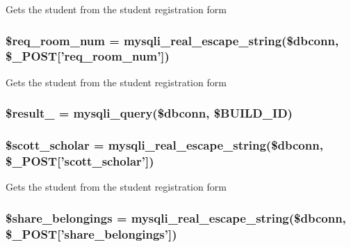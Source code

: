 \-Gets the student from the student registration form \hypertarget{admin__view_2validate_2studentVal_8php_a03ada09603995a51dc132367698e687d}{
\subsubsection[{\$req\-\_\-room\-\_\-num}]{\setlength{\rightskip}{0pt plus 5cm}\$req\-\_\-room\-\_\-num = mysqli\-\_\-real\-\_\-escape\-\_\-string(\$dbconn, \$\-\_\-\-P\-O\-S\-T\mbox{[}'req\-\_\-room\-\_\-num'\mbox{]})}}\label{admin__view_2validate_2studentVal_8php_a03ada09603995a51dc132367698e687d}
\-Gets the student from the student registration form \hypertarget{admin__view_2validate_2studentVal_8php_a0b3f63d6f969a6ad92963ceae90afab9}{
\subsubsection[{\$result\-\_\-9}]{\setlength{\rightskip}{0pt plus 5cm}\$result\-\_ = mysqli\-\_\-query(\$dbconn, \$\-B\-U\-I\-L\-D\-\_\-\-I\-D)}}\label{admin__view_2validate_2studentVal_8php_a0b3f63d6f969a6ad92963ceae90afab9}
\hypertarget{admin__view_2validate_2studentVal_8php_aeba3fa7111a05390371249cf7515b517}{
\subsubsection[{\$scott\-\_\-scholar}]{\setlength{\rightskip}{0pt plus 5cm}\$scott\-\_\-scholar = mysqli\-\_\-real\-\_\-escape\-\_\-string(\$dbconn, \$\-\_\-\-P\-O\-S\-T\mbox{[}'scott\-\_\-scholar'\mbox{]})}}\label{admin__view_2validate_2studentVal_8php_aeba3fa7111a05390371249cf7515b517}
\-Gets the student from the student registration form \hypertarget{admin__view_2validate_2studentVal_8php_ad62de11903542434007800bf0bc24594}{
\subsubsection[{\$share\-\_\-belongings}]{\setlength{\rightskip}{0pt plus 5cm}\$share\-\_\-belongings = mysqli\-\_\-real\-\_\-escape\-\_\-string(\$dbconn, \$\-\_\-\-P\-O\-S\-T\mbox{[}'share\-\_\-belongings'\mbox{]})}}\label{admin__view_2validate_2studentVal_8php_ad62de11903542434007800bf0bc24594}
